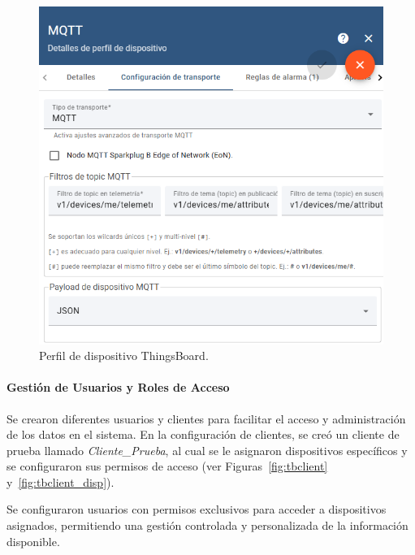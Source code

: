 \begin{figure}[H]
\leavevmode
\begin{minipage}{\textwidth}
\begin{center}
\includegraphics[scale=0.58]{./capitulo_04/imagen/tb/perfil_transport.png}
\caption{Perfil de dispositivo ThingsBoard. \label{fig:tbperfil}}
\end{center}
\end{minipage}
\end{figure}

\paragraph{Gestión de Usuarios y Roles de Acceso\\}

Se crearon diferentes usuarios y clientes para facilitar el acceso y administración de los datos en el sistema. En la configuración de clientes, se creó un cliente de prueba llamado \textit{Cliente\_Prueba}, al cual se le asignaron dispositivos específicos y se configuraron sus permisos de acceso (ver Figuras~\ref{fig:tbclient} y~\ref{fig:tbclient_disp}). 

Se configuraron usuarios con permisos exclusivos para acceder a dispositivos asignados, permitiendo una gestión controlada y personalizada de la información disponible.

